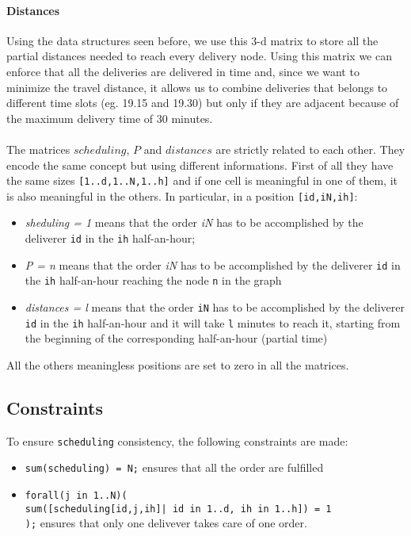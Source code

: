 \documentclass[10pt]{article}
\begin{document}

	\paragraph*{Distances}
	Using the data structures seen before, we use this 3-d matrix to store all
	the partial distances needed to reach every delivery node. Using this matrix we can 
	enforce that all the deliveries are delivered in time and, since we want to minimize 
	the travel distance, it allows us to combine deliveries that belongs to different
	time slots (eg. 19.15 and 19.30) but only if they are adjacent because of the maximum 
	delivery time of 30 minutes.

	\paragraph*{}
	The matrices $scheduling$, $P$ and $distances$ are strictly related to each other.
	They encode the same concept but using different informations. First of
	all they have the same sizes \texttt{[1..d,1..N,1..h]} and if one cell is meaningful in
	one	of them, it is also meaningful in the others.
	In particular, in a position 
	\texttt{[id,iN,ih]}:
	\begin{itemize}
		\item \textit{sheduling = 1} means that the order \textit{iN} has to be
		accomplished by the deliverer \texttt{id} in the \texttt{ih} half-an-hour;
		\item \textit{P = n} means that the order \textit{iN} has to be
		accomplished by the deliverer \texttt{id} in the \texttt{ih} half-an-hour 
		reaching the node \texttt{n} in the graph
		\item \textit{distances = l} means that the order \texttt{iN} has to be
		accomplished by the deliverer \texttt{id} in the \texttt{ih} half-an-hour 
		and it will take \texttt{l} minutes to reach it, starting from the beginning of the
		corresponding half-an-hour (partial time) 
		 
	\end{itemize}
	All the others meaningless positions are set to zero in all the matrices.

	\subsection{Constraints}

	To ensure \texttt{scheduling} consistency, the following constraints are made:
	\begin{itemize}
		\item \texttt{sum(scheduling) = N;} ensures that all the order are fulfilled %
		\item \texttt{forall(j in 1..N)(\\
			sum([scheduling[id,j,ih]| id in 1..d, ih in 1..h]) = 1\\
		  );} ensures that only one delivever takes care of one order. 
	\end{itemize}
\end{document}
